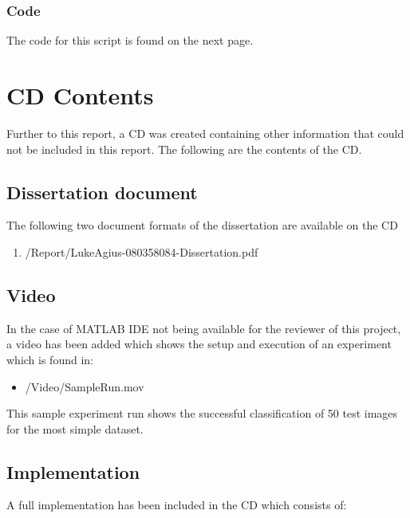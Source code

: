 \subsubsection{Code}
The code for this script is found on the next page.
\vspace{133.3mm}

\section{CD Contents}
\label{sec:CD}
Further to this report, a CD was created containing other information that could not be included in this report. The following are the contents of the CD.

\subsection{Dissertation document}
The following two document formats of the dissertation are available on the CD

    \begin{enumerate}
        \item /Report/LukeAgius-080358084-Dissertation.pdf
    \end{enumerate}

\subsection{Video}
In the case of MATLAB IDE not being available for the reviewer of this project, a video has been added which shows the setup and execution of an experiment which is found in:
            \begin{itemize}
                  \item /Video/SampleRun.mov
            \end{itemize}

This sample experiment run shows the successful classification of 50 test images for the most simple dataset.

\subsection{Implementation}
A full implementation has been included in the CD which consists of:


